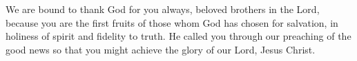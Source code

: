 \lettrine[lines=3]{W}{}e are bound to thank God for you always, beloved brothers in the Lord, because you are the first fruits of those whom God has chosen for salvation, in holiness of spirit and fidelity to truth. He called you through our preaching of the good news so that you might achieve the glory of our Lord, Jesus Christ.
